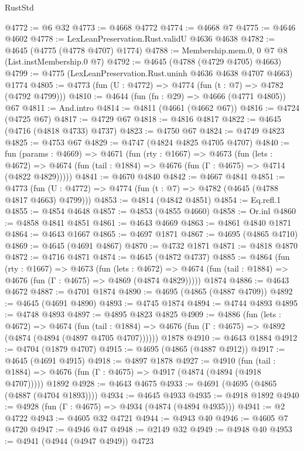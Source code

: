 \begin{lexlean}{RustStd}
\begin{coremodule}
@4772 := @6 @32
@4773 := @4668 @4772
@4774 := @4668 @7
@4775 := @4646 @4602
@4778 := LexLeanPreservation.Rust.validU @4636 @4638
@4782 := @4645 (@4775 (@4778 @4707) @1774)
@4788 := Membership.mem.{0, 0} @7 @8 (List.instMembership.{0} @7)
@4792 := @4645 (@4788 (@4729 @4705) @4663)
@4799 := @4775 (LexLeanPreservation.Rust.uninh @4636 @4638 @4707 @4663) @1774
@4805 := @4773 (fun (U : @4772) => @4774 (fun (t : @7) => @4782 (@4792 @4799)))
@4810 := @4644 (fun (fn : @29) => @4666 (@4771 @4805)) @67
@4811 := And.intro
@4814 := @4811 (@4661 (@4662 @67))
@4816 := @4724 (@4725 @67)
@4817 := @4729 @67
@4818 := @4816 @4817
@4822 := @4645 (@4716 (@4818 @4733) @4737)
@4823 := @4750 @67
@4824 := @4749 @4823
@4825 := @4753 @67
@4829 := @4747 (@4824 @4825 @4705 @4707)
@4840 := fun (params : @4669) =>
  @4671
    (fun (rty : @1667) =>
    @4673
      (fun (lets : @4672) =>
      @4674 (fun (tail : @1884) => @4676 (fun (Γ : @4675) => @4714 (@4822 @4829)))))
@4841 := @4670 @4840
@4842 := @4667 @4841
@4851 := @4773 (fun (U : @4772) => @4774 (fun (t : @7) => @4782 (@4645 (@4788 @4817 @4663) @4799)))
@4853 := @4814 (@4842 @4851)
@4854 := Eq.refl.{1}
@4855 := @4854 @4648
@4857 := @4853 (@4855 @4660)
@4858 := Or.inl
@4860 := @4858 @4841 @4851
@4861 := @4643 @4669
@4863 := @4861 @4840 @1871
@4864 := @4643 @1667
@4865 := @4697 @1871
@4867 := @4695 (@4865 @4710)
@4869 := @4645 (@4691 @4867)
@4870 := @4732 @1871
@4871 := @4818 @4870
@4872 := @4716 @4871
@4874 := @4645 (@4872 @4737)
@4885 := @4864
    (fun (rty : @1667) =>
    @4673
      (fun (lets : @4672) =>
      @4674 (fun (tail : @1884) => @4676 (fun (Γ : @4675) => @4869 (@4874 @4829)))))
    @1874
@4886 := @4643 @4672
@4887 := @4701 @1874
@4890 := @4695 (@4865 (@4887 @4709))
@4892 := @4645 (@4691 @4890)
@4893 := @4745 @1874
@4894 := @4744 @4893
@4895 := @4748 @4893
@4897 := @4895 @4823 @4825
@4909 := @4886
    (fun (lets : @4672) =>
    @4674
      (fun (tail : @1884) => @4676 (fun (Γ : @4675) => @4892 (@4874 (@4894 (@4897 @4705 @4707))))))
    @1878
@4910 := @4643 @1884
@4912 := @4704 (@1879 @4707)
@4915 := @4695 (@4865 (@4887 @4912))
@4917 := @4645 (@4691 @4915)
@4918 := @4897 @1878
@4927 := @4910
    (fun (tail : @1884) => @4676 (fun (Γ : @4675) => @4917 (@4874 (@4894 (@4918 @4707)))))
    @1892
@4928 := @4643 @4675
@4933 := @4691 (@4695 (@4865 (@4887 (@4704 @1893))))
@4934 := @4645 @4933
@4935 := @4918 @1892
@4940 := @4928 (fun (Γ : @4675) => @4934 (@4874 (@4894 @4935)))
@4941 := @2 @4722
@4943 := @4605 @32 @4721
@4944 := @4943 @40
@4946 := @4605 @7 @4720
@4947 := @4946 @47
@4948 := @2149 @32
@4949 := @4948 @40
@4953 := @4941 (@4944 (@4947 @4949)) @4723

\end{coremodule}
\end{lexlean}
